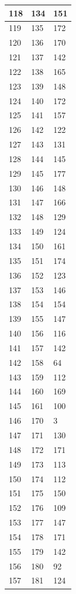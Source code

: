 \begin{tabular}{p{}p{}p{}}
\hline
118 & 134 & 151 \\
\hline
119 & 135 & 172 \\
\hline
120 & 136 & 170 \\
\hline
121 & 137 & 142 \\
\hline
122 & 138 & 165 \\
\hline
123 & 139 & 148 \\
\hline
124 & 140 & 172 \\
\hline
125 & 141 & 157 \\
\hline
126 & 142 & 122 \\
\hline
127 & 143 & 131 \\
\hline
128 & 144 & 145 \\
\hline
129 & 145 & 177 \\
\hline
130 & 146 & 148 \\
\hline
131 & 147 & 166 \\
\hline
132 & 148 & 129 \\
\hline
133 & 149 & 124 \\
\hline
134 & 150 & 161 \\
\hline
135 & 151 & 174 \\
\hline
136 & 152 & 123 \\
\hline
137 & 153 & 146 \\
\hline
138 & 154 & 154 \\
\hline
139 & 155 & 147 \\
\hline
140 & 156 & 116 \\
\hline
141 & 157 & 142 \\
\hline
142 & 158 & 64 \\
\hline
143 & 159 & 112 \\
\hline
144 & 160 & 169 \\
\hline
145 & 161 & 100 \\
\hline
146 & 170 & 3 \\
\hline
147 & 171 & 130 \\
\hline
148 & 172 & 171 \\
\hline
149 & 173 & 113 \\
\hline
150 & 174 & 112 \\
\hline
151 & 175 & 150 \\
\hline
152 & 176 & 109 \\
\hline
153 & 177 & 147 \\
\hline
154 & 178 & 171 \\
\hline
155 & 179 & 142 \\
\hline
156 & 180 & 92 \\
\hline
157 & 181 & 124 \\

\end{tabular}
